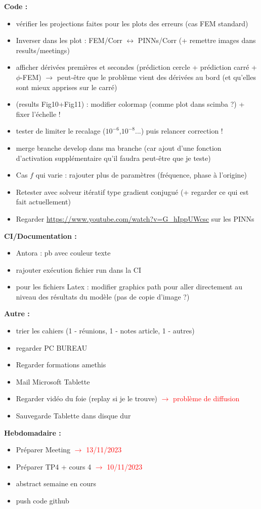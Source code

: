 \textbf{Code :}
\begin{itemize}[label=$\square$]
	\item vérifier les projections faites pour les plots des erreurs (cas FEM standard)
	\item Inverser dans les plot : FEM/Corr $\leftrightarrow$ PINNs/Corr (+ remettre images dans results/meetings)
	\item[\done] afficher dérivées premières et secondes (prédiction cercle + prédiction carré + $\phi$-FEM) $\rightarrow$ peut-être que le problème vient des dérivées au bord (et qu'elles sont mieux apprises sur le carré)
	\item (results Fig10+Fig11) : modifier colormap (comme plot dans scimba ?) + fixer l'échelle !
	\item tester de limiter le recalage ($10^{-6}$,$10^{-8}$...) puis relancer correction !
	\item merge branche develop dans ma branche (car ajout d'une fonction d'activation supplémentaire qu'il faudra peut-être que je teste)
	\item Cas $f$ qui varie : rajouter plus de paramètres (fréquence, phase à l'origine) 
	\item Retester avec solveur itératif type gradient conjugué (+ regarder ce qui est fait actuellement)
	\item Regarder \url{https://www.youtube.com/watch?v=G_hIppUWcsc} sur les PINNs
\end{itemize}
\textbf{CI/Documentation :}
\begin{itemize}[label=$\square$]
	\item Antora : pb avec couleur texte
	\item[\done] rajouter exécution fichier run dans la CI
	\item[\wontfix] pour les fichiers Latex : modifier graphics path pour aller directement au niveau des résultats du modèle (pas de copie d'image ?) 
\end{itemize}
\textbf{Autre :}
\begin{itemize}[label=$\square$]
	\item[\done] trier les cahiers (1 - réunions, 1 - notes article, 1 - autres)
	\item[\done] regarder PC BUREAU
	\item Regarder formations amethis
	\item[\done] Mail Microsoft Tablette
	\item[\wontfix] Regarder vidéo du foie (replay si je le trouve) \textcolor{red}{$\rightarrow$ problème de diffusion}
	\item Sauvegarde Tablette dans disque dur
\end{itemize}
\textbf{Hebdomadaire :}
\begin{itemize}[label=$\square$]
	\item[\done] Préparer Meeting \textcolor{red}{$\rightarrow$ 13/11/2023}
	\item[\done] Préparer TP4 + cours 4 \textcolor{red}{$\rightarrow$ 10/11/2023}
	\item[\done] abstract semaine en cours
	\item[\done] push code github
\end{itemize}